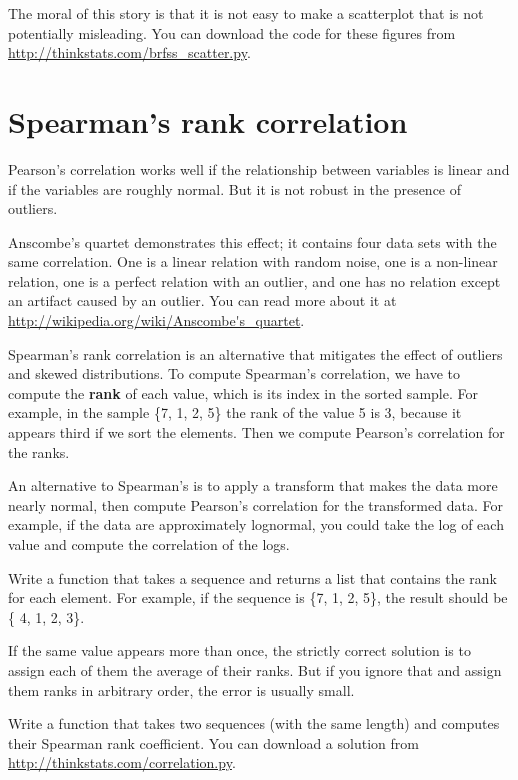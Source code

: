 \documentclass[12pt]{book}
\begin{document}
The moral of this story is that it is
not easy to make a scatterplot that is not potentially misleading.
You can download the code for these figures from
\url{http://thinkstats.com/brfss_scatter.py}.

\section{Spearman's rank correlation}

Pearson's correlation works well if the relationship between variables
is linear and if the variables are roughly normal.  But it is not
robust in the presence of outliers.

Anscombe's quartet demonstrates this effect; it contains four data
sets with the same correlation.  One is a linear relation with random
noise, one is a non-linear relation, one is a perfect relation with an
outlier, and one has no relation except an artifact caused by an
outlier.  You can read more about it at
\url{http://wikipedia.org/wiki/Anscombe's_quartet}.

Spearman's rank correlation is an alternative that mitigates the
effect of outliers and skewed distributions.  To compute Spearman's
correlation, we have to compute the {\bf rank} of each value, which is its
index in the sorted sample.  For example, in the sample \{7, 1, 2, 5\}
the rank of the value 5 is 3, because it appears third if we sort
the elements.  Then we compute Pearson's correlation for the ranks.

An alternative to Spearman's is to apply a transform that makes the
data more nearly normal, then compute Pearson's correlation for the
transformed data.  For example, if the data are approximately
lognormal, you could take the log of each value and compute the
correlation of the logs.

\begin{exercise}
Write a function that takes a sequence and returns a list that
contains the rank for each element.  For example, if the sequence is
\{7, 1, 2, 5\}, the result should be \{ 4, 1, 2, 3\}.

If the same value appears more than once, the strictly correct
solution is to assign each of them the average of their ranks.  But if
you ignore that and assign them ranks in arbitrary order, the error is
usually small.

Write a function that takes two sequences (with the same length) and
computes their Spearman rank coefficient.  You can download a solution
from \url{http://thinkstats.com/correlation.py}.

\end{exercise}
\end{document}

